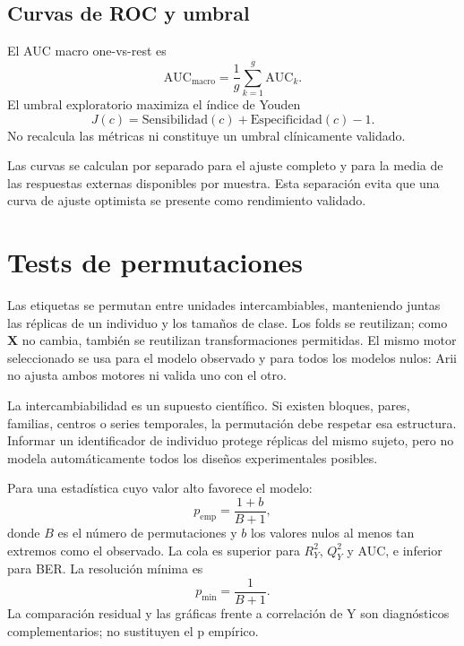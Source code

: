\documentclass[11pt,a4paper,openany]{report}
\newcommand{\RtwoY}{R^{2}_{Y}}
\newcommand{\QtwoY}{Q^{2}_{Y}}
\newcommand{\vect}[1]{\boldsymbol{#1}}
\begin{document}
\section{Curvas de ROC y umbral}
El AUC macro one-vs-rest es
\begin{equation}
  \mathrm{AUC}_{\mathrm{macro}}=\frac{1}{g}\sum_{k=1}^{g}\mathrm{AUC}_k.
\end{equation}
El umbral exploratorio maximiza el índice de Youden
\begin{equation}
  J(c)=\mathrm{Sensibilidad}(c)+\mathrm{Especificidad}(c)-1.
\end{equation}
No recalcula las métricas ni constituye un umbral clínicamente validado.

Las curvas se calculan por separado para el ajuste completo y para la media de las respuestas externas disponibles por muestra. Esta separación evita que una curva de ajuste optimista se presente como rendimiento validado.

\chapter{Tests de permutaciones}
Las etiquetas se permutan entre unidades intercambiables, manteniendo juntas las réplicas de un individuo y los tamaños de clase. Los folds se reutilizan; como $\vect{X}$ no cambia, también se reutilizan transformaciones permitidas.
El mismo motor seleccionado se usa para el modelo observado y para todos los modelos nulos: Arii no ajusta ambos motores ni valida uno con el otro.

La intercambiabilidad es un supuesto científico. Si existen bloques, pares, familias, centros o series temporales, la permutación debe respetar esa estructura. Informar un identificador de individuo protege réplicas del mismo sujeto, pero no modela automáticamente todos los diseños experimentales posibles.

Para una estadística cuyo valor alto favorece el modelo:
\begin{equation}
  p_{\mathrm{emp}}=\frac{1+b}{B+1},
\end{equation}
donde $B$ es el número de permutaciones y $b$ los valores nulos al menos tan extremos como el observado. La cola es superior para $\RtwoY$, $\QtwoY$ y AUC, e inferior para BER. La resolución mínima es
\begin{equation}
  p_{\min}=\frac{1}{B+1}.
\end{equation}
La comparación residual y las gráficas frente a correlación de Y son diagnósticos complementarios; no sustituyen el p empírico.
\end{document}
